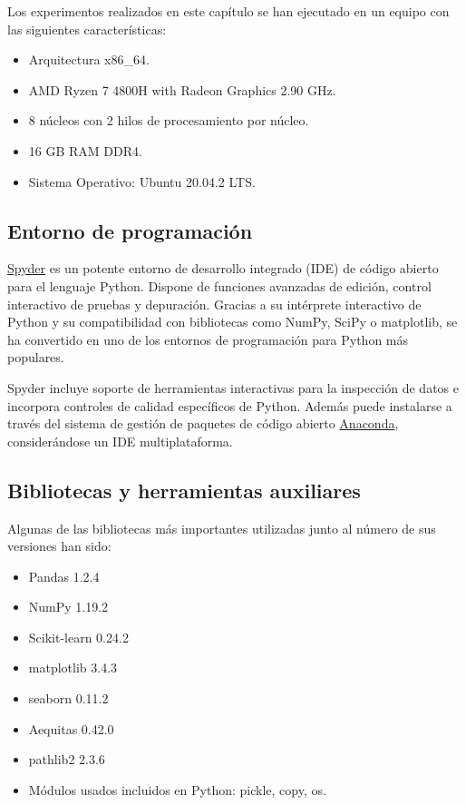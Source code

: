 \documentclass[oneside,openright,titlepage,numbers=noenddot,openany,headinclude,footinclude=true,
cleardoublepage=empty,abstractoff,BCOR=5mm,paper=a4,fontsize=12pt,main=spanish]{scrreprt}
\begin{document}
Los experimentos realizados en este capítulo se han ejecutado en un equipo con las siguientes características:

\begin{itemize}
    \item Arquitectura x86\_64.
    \item AMD Ryzen 7 4800H with Radeon Graphics 2.90 GHz.
    \item 8 núcleos con 2 hilos de procesamiento por núcleo.
    \item 16 GB RAM DDR4.
    \item Sistema Operativo: Ubuntu 20.04.2 LTS.
\end{itemize}

\subsection{Entorno de programación}

\href{https://docs.spyder-ide.org/current/index.html}{Spyder} es un potente entorno de desarrollo integrado (IDE) de código abierto para el lenguaje Python. Dispone de funciones avanzadas de edición, control interactivo de pruebas y depuración. Gracias a su intérprete interactivo de Python y su compatibilidad con bibliotecas como NumPy, SciPy o matplotlib, se ha convertido en uno de los entornos de programación para Python más populares. 

Spyder incluye soporte de herramientas interactivas para la inspección de datos e incorpora controles de calidad específicos de Python. Además puede instalarse a través del sistema de gestión de paquetes de código abierto \href{https://docs.anaconda.com/}{Anaconda}, considerándose un IDE multiplataforma.

\subsection{Bibliotecas y herramientas auxiliares}

Algunas de las bibliotecas más importantes utilizadas junto al número de sus versiones han sido:

\begin{itemize}
    \item Pandas 1.2.4
    \item NumPy 1.19.2
    \item Scikit-learn 0.24.2
    \item matplotlib 3.4.3
    \item seaborn 0.11.2
    \item Aequitas 0.42.0
    \item pathlib2 2.3.6
    \item Módulos usados incluidos en Python: pickle, copy, os.
\end{itemize}
\end{document}
